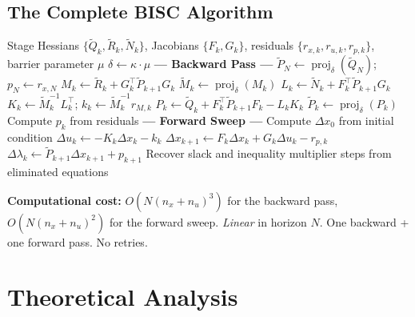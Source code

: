 \documentclass[11pt]{article}
\DeclareMathOperator{\proj}{proj}
\begin{document}
\subsection{The Complete BISC Algorithm}

\begin{algorithm}[H]
\caption{BISC: Block Inertia-free Structural Convexification}
\label{alg:bisc}
\begin{algorithmic}[1]
\REQUIRE Stage Hessians $\{\tilde{Q}_k, \tilde{R}_k, \tilde{N}_k\}$, Jacobians $\{F_k, G_k\}$,
         residuals $\{r_{x,k}, r_{u,k}, r_{p,k}\}$, barrier parameter $\mu$
\STATE $\delta \leftarrow \kappa \cdot \mu$
\STATE \textbf{--- Backward Pass ---}
\STATE $\tilde{P}_N \leftarrow \proj_\delta(\tilde{Q}_N)$; \quad $p_N \leftarrow r_{x,N}$
  \STATE $M_k \leftarrow \tilde{R}_k + G_k^\top \tilde{P}_{k+1} G_k$
  \STATE $\tilde{M}_k \leftarrow \proj_\delta(M_k)$
  \STATE $L_k \leftarrow \tilde{N}_k + F_k^\top \tilde{P}_{k+1} G_k$
  \STATE $K_k \leftarrow \tilde{M}_k^{-1} L_k^\top$; \quad
         $k_k \leftarrow \tilde{M}_k^{-1} r_{M,k}$
  \STATE $P_k \leftarrow \tilde{Q}_k + F_k^\top \tilde{P}_{k+1} F_k - L_k K_k$
  \STATE $\tilde{P}_k \leftarrow \proj_\delta(P_k)$
  \STATE Compute $p_k$ from residuals
\ENDFOR
\STATE \textbf{--- Forward Sweep ---}
\STATE Compute $\Delta x_0$ from initial condition
  \STATE $\Delta u_k \leftarrow -K_k \Delta x_k - k_k$
  \STATE $\Delta x_{k+1} \leftarrow F_k \Delta x_k + G_k \Delta u_k - r_{p,k}$
  \STATE $\Delta \lambda_k \leftarrow \tilde{P}_{k+1} \Delta x_{k+1} + p_{k+1}$
\ENDFOR
\STATE Recover slack and inequality multiplier steps from eliminated equations
\end{algorithmic}
\end{algorithm}

\textbf{Computational cost:}
$O(N(n_x + n_u)^3)$ for the backward pass, $O(N(n_x + n_u)^2)$ for the forward
sweep. \emph{Linear} in horizon $N$. One backward + one forward pass. No retries.


\section{Theoretical Analysis}
\end{document}
